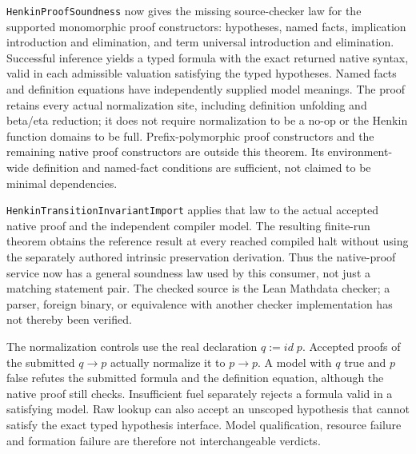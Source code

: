 \documentclass[11pt]{article}
\theoremstyle{definition}
\theoremstyle{remark}
\begin{document}
\nolinkurl{HenkinProofSoundness} now gives the missing source-checker law for
the supported monomorphic proof constructors: hypotheses, named facts,
implication introduction and elimination, and term universal introduction
and elimination. Successful inference yields a typed formula with the exact
returned native syntax, valid in each admissible valuation satisfying the
typed hypotheses. Named facts and definition equations have independently
supplied model meanings. The proof retains every actual normalization site,
including definition unfolding and beta/eta reduction; it does not require
normalization to be a no-op or the Henkin function domains to be full.
Prefix-polymorphic proof constructors and the remaining native proof
constructors are outside this theorem. Its environment-wide definition and
named-fact conditions are sufficient, not claimed to be minimal dependencies.

\nolinkurl{HenkinTransitionInvariantImport} applies that law to the actual
accepted native proof and the independent compiler model. The resulting
finite-run theorem obtains the reference result at every reached compiled
halt without using the separately authored intrinsic preservation derivation.
Thus the native-proof service now has a general soundness law used by this
consumer, not just a matching statement pair. The checked source is the Lean
Mathdata checker; a parser, foreign binary, or equivalence with another
checker implementation has not thereby been verified.

The normalization controls use the real declaration $q:=\mathit{id}\;p$.
Accepted proofs of the submitted $q\to p$ actually normalize it to $p\to p$.
A model with $q$ true and $p$ false refutes the submitted formula and the
definition equation, although the native proof still checks. Insufficient
fuel separately rejects a formula valid in a satisfying model. Raw lookup
can also accept an unscoped hypothesis that cannot satisfy the exact typed
hypothesis interface. Model qualification, resource failure and formation
failure are therefore not interchangeable verdicts.
\end{document}
